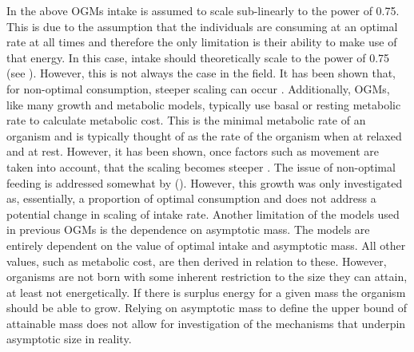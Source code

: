 \documentclass[a4paper, 11pt, hidelinks]{article} %
\begin{document}
	

	In the above OGMs intake is assumed to scale sub-linearly to the power of 0.75.  This is due to the assumption that the individuals are consuming at an optimal rate at all times and therefore the only limitation is their ability to make use of that energy.  In this case, intake should theoretically scale to the power of 0.75 (see \cite{West1997}).  However, this is not always the case in the field.  It has been shown that, for non-optimal consumption, steeper scaling can occur \parencite{Pawar2012, Peters1983}. Additionally, OGMs, like many growth and metabolic models, typically use basal or resting metabolic rate to calculate metabolic cost.  This is the minimal metabolic rate of an organism and is typically thought of as the rate of the organism when at relaxed and at rest.  However, it has been shown, once factors such as movement are taken into account, that the scaling becomes steeper \parencite{Weibel2004}.
	The issue of non-optimal feeding is addressed somewhat by \citeauthor{Hou2011} (\citeyear{Hou2011}).  However, this growth was only investigated as, essentially, a proportion of optimal consumption and does not address a potential change in scaling of intake rate.
	Another limitation of the models used in previous OGMs is the dependence on asymptotic mass.  The models are entirely dependent on the value of optimal intake and asymptotic mass.  All other values, such as metabolic cost, are then derived in relation to these.  However, organisms are not born with some inherent restriction to the size they can attain, at least not energetically.  If there is surplus energy for a given mass the organism should be able to grow.  Relying on asymptotic mass to define the upper bound of attainable mass does not allow for investigation of the mechanisms that underpin asymptotic size in reality. 
	
\end{document}
